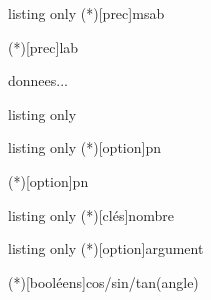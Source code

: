 \documentclass[a4paper,french,11pt]{article}
\begin{document}
\begin{PresCodeTexPL}{listing only}
\NormaleC(*)[prec]{m}{s}{a}{b}

\ExpoC(*)[prec]{l}{a}{b}

\begin{EnvArbreProbasTikz}[options]{donnees}...\end{EnvArbreProbasTikz}

\end{PresCodeTexPL}

\begin{PresCodeTexPL}{listing only}
\end{PresCodeTexPL}

\begin{PresCodeTexPL}{listing only}
\Arrangement(*)[option]{p}{n}

\Combinaison(*)[option]{p}{n}
\end{PresCodeTexPL}

\begin{PresCodeTexPL}{listing only}
\ConversionDecBin(*)[clés]{nombre}

\end{PresCodeTexPL}

\begin{PresCodeTexPL}{listing only}
\ConversionFraction(*)[option]{argument}



\LigneTrigo(*)[booléens]{cos/sin/tan}(angle)
\end{PresCodeTexPL}
\end{document}
